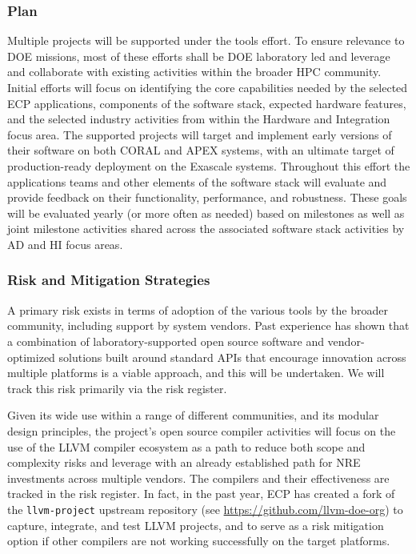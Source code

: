 \subsubsection{Plan}
Multiple projects will be supported under the tools effort. To ensure relevance to DOE missions, most of these efforts shall be DOE laboratory led and leverage and collaborate with existing activities within the broader HPC community. Initial efforts will focus on identifying the core capabilities needed by the selected ECP applications, components of the software stack, expected hardware features, and the selected industry activities from within the Hardware and Integration focus area. The supported projects will target and implement early versions of their software on both CORAL and APEX systems, with an ultimate target of production-ready deployment on the Exascale systems. Throughout this effort the applications teams and other elements of the software stack will evaluate and provide feedback on their functionality, performance, and robustness. These goals will be evaluated yearly (or more often as needed) based on milestones as well as joint milestone activities shared across the associated software stack activities by AD and HI focus areas.

\subsubsection{Risk and Mitigation Strategies}

A primary risk exists in terms of adoption of the various tools by the broader community, including support by system vendors. Past experience has shown that a combination of laboratory-supported open source software and vendor-optimized solutions built around standard APIs that encourage innovation across multiple platforms is a viable approach, and this will be undertaken. We will track this risk primarily via the risk register.

Given its wide use within a range of different communities, and its modular design principles, the project's open source compiler activities will focus on the use of the LLVM compiler ecosystem as a path to reduce both scope and complexity risks and leverage with an already established path for NRE investments across multiple vendors. The compilers and their effectiveness are tracked in the risk register. 
%
In fact, in the past year, ECP has created a fork of the \texttt{llvm-project} upstream repository (see \url{https://github.com/llvm-doe-org}) to capture, integrate, and test LLVM projects, and to serve as a risk mitigation option if other compilers are not working successfully on the target platforms.

